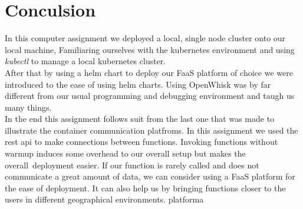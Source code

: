 \documentclass[a4paper, 11pt]{article}
\theoremstyle{nonumberplain}
\begin{document}
\section{Conculsion}
In this computer assignment we deployed a local, single node cluster onto our
local machine, Familiaring ourselves with the kubernetes environment and using
\textit{kubectl} to manage a local kubernetes cluster. \\
After that by using a helm chart to deploy our FaaS platform of choice we were
introduced to the ease of using helm charts.
Using OpenWhisk was by far different from our usual programming and debugging
environment and taugh us many things. \\
In the end this assignment follows suit from the last one that was made to
illustrate the container communication platfroms. In this assignment we used
the rest api to make connections between functions. Invoking functions without
warmup induces some overhead to our overall setup but makes the overall\
deployment easier. If our function is rarely called and
does not communicate a great amount of data, we can consider using a FaaS
platform for the ease of deployment. It can also help us by bringing functions
closer to the users in different geographical environments.
platforma



% 
\end{document}
